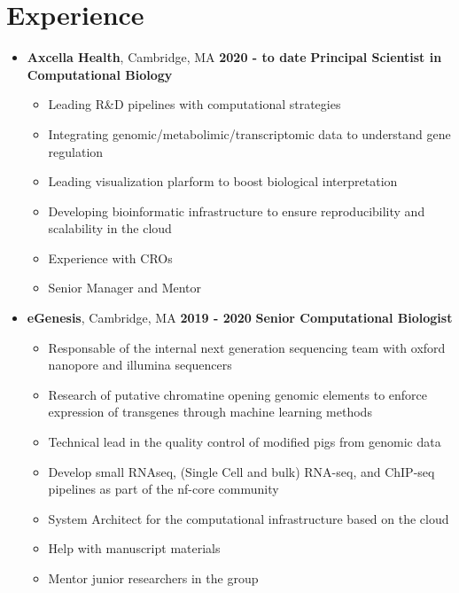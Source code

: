 \hypertarget{experience}{%
\section{Experience}\label{experience}}

\begin{itemize}

\item
\textbf{Axcella Health}, Cambridge, MA \hfill \textbf{2020 - to date}
\newline
\textbf{Principal Scientist in Computational Biology}
\begin{itemize}
\item
  Leading R\&D pipelines with computational strategies
\item
  Integrating genomic/metabolimic/transcriptomic data to understand gene regulation
\item 
  Leading visualization plarform to boost biological interpretation
\item 
  Developing bioinformatic infrastructure to ensure reproducibility and scalability in the cloud
\item
  Experience with CROs
\item
  Senior Manager and Mentor
\end{itemize}

\item
\textbf{eGenesis}, Cambridge, MA \hfill \textbf{2019 - 2020}
\newline
\textbf{Senior Computational Biologist}
 \begin{itemize}

\item
  Responsable of the internal next generation sequencing team with oxford nanopore and illumina sequencers
\item
  Research of putative chromatine opening genomic elements to enforce expression of transgenes through machine learning methods
\item
  Technical lead in the quality control of modified pigs from genomic data
\item 
  Develop small RNAseq, (Single Cell and bulk) RNA-seq, and ChIP-seq pipelines
  as part of the nf-core community
\item System Architect for the computational infrastructure based on the cloud
\item
  Help with manuscript materials
\item Mentor junior researchers in the group
 \end{itemize}



\end{itemize}
